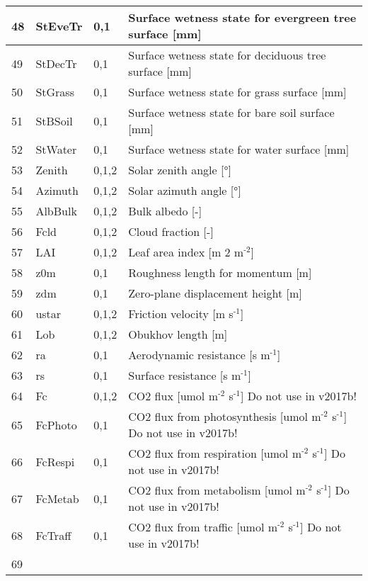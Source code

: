 \documentclass[letterpaper,10pt,english]{sphinxmanual}
\begin{document}
\begin{savenotes}
\begin{longtable}{|l|l|l|l|}
\\
\hline
48
&
StEveTr
&
0,1
&
Surface wetness state for evergreen tree surface {[}mm{]}
\\
\hline
49
&
StDecTr
&
0,1
&
Surface wetness state for deciduous tree surface {[}mm{]}
\\
\hline
50
&
StGrass
&
0,1
&
Surface wetness state for grass surface {[}mm{]}
\\
\hline
51
&
StBSoil
&
0,1
&
Surface wetness state for bare soil surface {[}mm{]}
\\
\hline
52
&
StWater
&
0,1
&
Surface wetness state for water surface {[}mm{]}
\\
\hline
53
&
Zenith
&
0,1,2
&
Solar zenith angle {[}°{]}
\\
\hline
54
&
Azimuth
&
0,1,2
&
Solar azimuth angle {[}°{]}
\\
\hline
55
&
AlbBulk
&
0,1,2
&
Bulk albedo {[}-{]}
\\
\hline
56
&
Fcld
&
0,1,2
&
Cloud fraction {[}-{]}
\\
\hline
57
&
LAI
&
0,1,2
&
Leaf area index {[}m 2 m$^{\text{-2}}${]}
\\
\hline
58
&
z0m
&
0,1
&
Roughness length for momentum {[}m{]}
\\
\hline
59
&
zdm
&
0,1
&
Zero-plane displacement height {[}m{]}
\\
\hline
60
&
ustar
&
0,1,2
&
Friction velocity {[}m s$^{\text{-1}}${]}
\\
\hline
61
&
Lob
&
0,1,2
&
Obukhov length {[}m{]}
\\
\hline
62
&
ra
&
0,1
&
Aerodynamic resistance {[}s m$^{\text{-1}}${]}
\\
\hline
63
&
rs
&
0,1
&
Surface resistance {[}s m$^{\text{-1}}${]}
\\
\hline
64
&
Fc
&
0,1,2
&
CO2 flux {[}umol m$^{\text{-2}}$ s$^{\text{-1}}${]} Do not use in v2017b!
\\
\hline
65
&
FcPhoto
&
0,1
&
CO2 flux from photosynthesis {[}umol m$^{\text{-2}}$ s$^{\text{-1}}${]} Do not use in v2017b!
\\
\hline
66
&
FcRespi
&
0,1
&
CO2 flux from respiration {[}umol m$^{\text{-2}}$ s$^{\text{-1}}${]} Do not use in v2017b!
\\
\hline
67
&
FcMetab
&
0,1
&
CO2 flux from metabolism {[}umol m$^{\text{-2}}$ s$^{\text{-1}}${]} Do not use in v2017b!
\\
\hline
68
&
FcTraff
&
0,1
&
CO2 flux from traffic {[}umol m$^{\text{-2}}$ s$^{\text{-1}}${]} Do not use in v2017b!
\\
\hline
69
&

\end{longtable}
\end{savenotes}
\end{document}
